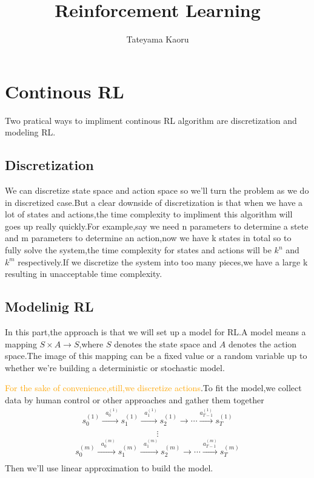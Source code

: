 \documentclass{article}
\begin{document}
	\title{Reinforcement Learning}
	\author{Tateyama Kaoru}
	\maketitle
\section{Continous RL}
Two pratical ways to impliment continous RL algorithm are discretization and modeling RL.
\subsection{Discretization}
We can discretize state space and action space so we'll turn the problem as we do in discretized case.But a clear downside of discretization is that when we have a lot of states and actions,the time complexity to impliment this algorithm will goes up really quickly.For example,say we need n parameters to determine a stete and m parameters to determine an action,now we have k states in total so to fully solve the system,the time complexity for states and actions will be $k^n$ and $k^m$ respectively.If we discretize the system into too many pieces,we have a large k resulting in unacceptable time complexity.
\subsection{Modelinig RL}
In this part,the approach is that we will set up a model for RL.A model means a mapping $S\times A\rightarrow S$,where $S$ denotes the state space and $A$ denotes the action space.The image of this mapping can be a fixed value or a random variable up to whether we're building a deterministic or stochastic model.
\begin{center}
\end{center}
\textcolor{orange}{For the sake of convenience,still,we discretize actions}.To fit the model,we collect data by human control or other approaches and gather them together
\vspace{2\baselineskip}
\begin{align*}
	s^{(1)}_0\overset{\;\;a^{(1)}_0}{\longrightarrow}s^{(1)}_1\overset{\;\;a^{(1)}_1}{\longrightarrow}s^{(1)}_2\longrightarrow\cdots\overset{a^{(1)}_{T-1}}{\longrightarrow}s^{(1)}_T\\ 
\end{align*}
\[\vdots\]
\begin{align*}
	s^{(m)}_0\overset{\;\;a^{(m)}_0}{\longrightarrow}s^{(m)}_1\overset{\;\;a^{(m)}_1}{\longrightarrow}s^{(m)}_2\longrightarrow\cdots\overset{a^{(m)}_{T-1}}{\longrightarrow}s^{(m)}_T\\ 
\end{align*}
Then we'll use linear approximation to build the model.
\end{document}
